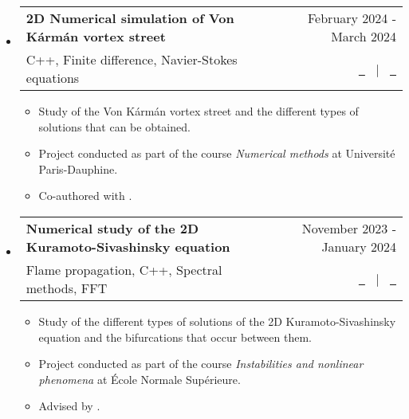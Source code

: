 \documentclass[a4paper,11pt]{article}
\makeatletter
\newcommand{\resumeQuadHeading}[4]{
  \item
  \begin{tabular*}{0.96\textwidth}[t]{l@{\extracolsep{\fill}}r}
    \textbf{#1} & \small #2 \\
    \small#3 & \small #4 \\
  \end{tabular*}
}
\newcommand{\resumeHeadingListStart}{
  \begin{itemize}[leftmargin=0.15in, label={}]
}
\newcommand{\resumeHeadingListEnd}{\end{itemize}}
\makeatother
\begin{document}
\begin{itemize}[leftmargin=3em, itemsep=0.1em, topsep=2pt]
\resumeHeadingListStart{}
\resumeQuadHeading{2D Numerical simulation of Von Kármán vortex street}{February 2024 - March 2024}{C++, Finite difference, Navier-Stokes equations}{\href{https://github.com/victorballester7/von-karman/releases/latest/download/main.pdf}{\faFileTextO \ \graydotuline{Report}} \ $|$ \ \href{https://github.com/victorballester7/von-karman/tree/main}{\faGithub \ \graydotuline{Code}}}
\begin{itemize}[leftmargin=3em, itemsep=0.1em, topsep=2pt]
	\item \small Study of the Von Kármán vortex street and the different types of solutions that can be obtained.
	\item \small Project conducted as part of the course \textit{Numerical methods} at Université Paris-Dauphine.
	\item \small Co-authored with \href{https://www.linkedin.com/in/jona-nägerl-3910a5243/}{}.
\end{itemize}
\resumeHeadingListEnd{}

\resumeHeadingListStart{}
\resumeQuadHeading{Numerical study of the 2D Kuramoto-Sivashinsky equation}{November 2023 - January 2024}{Flame propagation, C++, Spectral methods, FFT}{\href{https://github.com/victorballester7/2D-kuramoto-sivashinsky/releases/latest/download/main.pdf}{\faFileTextO \ \graydotuline{Report}} \ $|$ \ \href{https://github.com/victorballester7/2D-kuramoto-sivashinsky}{\faGithub \ \graydotuline{Code}}}
\begin{itemize}[leftmargin=3em, itemsep=0.1em, topsep=2pt]
	\item \small Study of the different types of solutions of the 2D Kuramoto-Sivashinsky equation and the bifurcations that occur between them.
	\item \small Project conducted as part of the course \textit{Instabilities and nonlinear phenomena} at École Normale Supérieure.
	\item \small Advised by \href{https://blog.espci.fr/laurette/}{}.
\end{itemize}
\resumeHeadingListEnd{}


\end{itemize}
\end{document}
